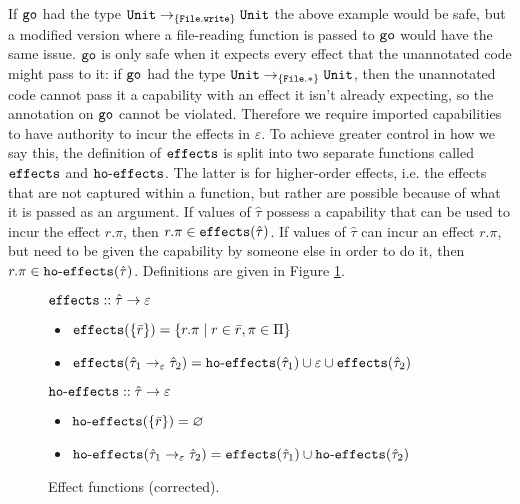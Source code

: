 If $\mathtt{go}$ had the type $\mathtt{Unit} \rightarrow_{\{ \mathtt{File.write} \}} \mathtt{Unit}$ the above example would be safe, but a modified version where a file-reading function is passed to $\mathtt{go}$ would have the same issue. $\mathtt{go}$ is only safe when it expects every effect that the unannotated code might pass to it: if $\mathtt{go}$ had the type $\mathtt{Unit} \rightarrow_{\{ \mathtt{File.*} \}} \mathtt{Unit}$, then the unannotated code cannot pass it a capability with an effect it isn't already expecting, so the annotation on $\mathtt{go}$ cannot be violated. Therefore we require imported capabilities to have authority to incur the effects in $\varepsilon$. To achieve greater control in how we say this, the definition of $\mathtt{effects}$ is split into two separate functions called $\mathtt{effects}$ and $\mathtt{ho \hbox{-} effects}$. The latter is for higher-order effects, i.e. the effects that are not captured within a function, but rather are possible because of what it is passed as an argument. If values of $\hat \tau$ possess a capability that can be used to incur the effect $r.\pi$, then $r.\pi \in \mathtt{effects}(\hat \tau)$. If values of $\hat \tau$ can incur an effect $r.\pi$, but need to be given the capability by someone else in order to do it, then $r.\pi \in \mathtt{ho \hbox{-} effects}(\hat \tau)$. Definitions are given in Figure \ref{fig:fx_defns}.


\begin{figure}[h]

$\mathtt{effects} :: \hat \tau \rightarrow \varepsilon$

\begin{itemize}
	\setlength\itemsep{-0.2em}
	\item[] $\mathtt{effects}(\{ \bar r \}) = \{ r.\pi \mid r \in \bar r, \pi \in \Pi \}$
	\item[] $\mathtt{effects}(\hat \tau_1 \rightarrow_{\varepsilon} \hat \tau_2) = \mathtt{ho \hbox{-} effects}(\hat \tau_1) \cup \varepsilon \cup \mathtt{effects}(\hat \tau_2)$
\end{itemize}

$\mathtt{ho \hbox{-} effects} :: \hat \tau \rightarrow \varepsilon$

\begin{itemize}
	\setlength\itemsep{-0.2em}
	\item[] $\mathtt{ho \hbox{-} effects}(\{ \bar r \}) = \varnothing$
	\item[] $\mathtt{ho \hbox{-} effects}(\hat \tau_1 \rightarrow_{\varepsilon} \hat \tau_2) = \mathtt{effects}(\hat \tau_1) \cup \mathtt{ho \hbox{-} effects}(\hat \tau_2)$
\end{itemize}

\vspace{-7pt}
\caption{Effect functions (corrected).}
\label{fig:fx_defns}
\end{figure}

